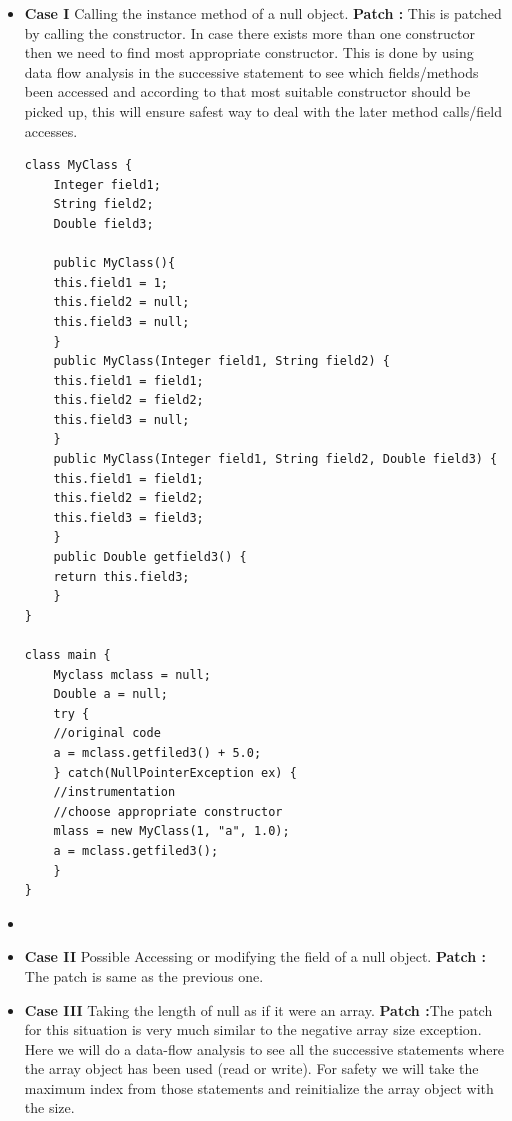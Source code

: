 \begin{itemize}
  \item \textbf{Case I} Calling the instance method of a null object. \newline
  \textbf{Patch :} This is patched by calling the constructor. In case there
  exists more than one constructor then we need to find most appropriate
  constructor. This is done by using data flow analysis in the successive
  statement to see which fields/methods been accessed and according to that
  most suitable constructor should be picked up, this will ensure safest way to
  deal with the later method calls/field accesses.
  
  \lstset{language=Java, caption=appropriate constructor,
label=patchingexample2}

\begin{lstlisting}[countblanklines=false]
class MyClass {
    Integer field1;
    String field2;
    Double field3;

    public MyClass(){
	this.field1 = 1;
	this.field2 = null;
	this.field3 = null;
    }
    public MyClass(Integer field1, String field2) {
	this.field1 = field1;
	this.field2 = field2;
	this.field3 = null;
    }
    public MyClass(Integer field1, String field2, Double field3) {
	this.field1 = field1;
	this.field2 = field2;
	this.field3 = field3;
    }
    public Double getfield3() {
	return this.field3;
    }
}

class main {
    Myclass mclass = null;
    Double a = null;
    try {
	//original code
	a = mclass.getfiled3() + 5.0;
    } catch(NullPointerException ex) {
	//instrumentation
	//choose appropriate constructor
	mlass = new MyClass(1, "a", 1.0);
	a = mclass.getfiled3();
    }
}
\end{lstlisting}
  \item 
  
  \item \textbf{Case II} Possible Accessing or modifying the field of a null
  object.\newline
  \textbf{Patch :} The patch is same as the previous one.
  
  \item \textbf{Case III} Taking the length of null as if it were an
  array.\newline
  \textbf{Patch :}The patch for this situation is very much similar to the
  negative array size exception. Here we will do a data-flow analysis to see all
  the successive statements where the array object has been used (read or
  write). For safety we will take the maximum index from those statements and
  reinitialize the array object with the size.
    

\end{itemize}
